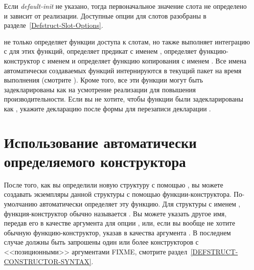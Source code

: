 \begin{defmac}
Если \emph{default-init} не указано, тогда первоначальное значение слота не
определено и зависит от реализации. Доступные опции для слотов разобраны в
разделе~\ref{Defstruct-Slot-Options}.

 не только определяет функции доступа к слотам, но также
выполняет интеграцию с  для этих функций, определяет предикат с
именем , определяет функцию-конструктор с именем
 и определяет функцию копирования с именем
.
Все имена автоматически создаваемых функций интернируются в текущий пакет на время
выполнения  (смотрите ).
Кроме того, все эти функции могут быть задекларированы как  на
усмотрение реализации для повышения производительности.
Если вы не хотите, чтобы функции были задекларированы как , укажите
декларацию  после формы  для перезаписи декларации
.
\end{defmac}

\section{Использование автоматически определяемого конструктора}

После того, как вы определили новую структуру с помощью , вы
можете создавать экземпляры данной структуры с помощью функции-конструктора.
По-умолчанию  автоматически определяет эту функцию.
Для структуры с именем , функция-конструктор обычно называется
.
Вы можете указать другое имя, передав его в качестве аргумента для опции
, или, если вы вообще не хотите обычную функцию-конструктор, указав в качества аргумента {\false}. 
В последнем случае должны быть запрошены один или более конструкторов
с <<позиционными>> аргументами FIXME, смотрите раздел~\ref{DEFSTRUCT-CONSTRUCTOR-SYNTAX}.

